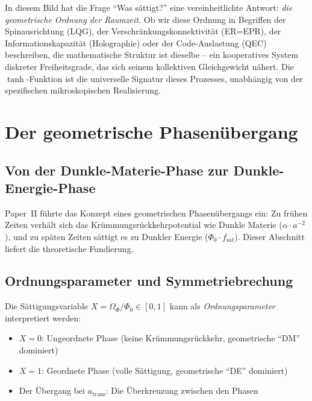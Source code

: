 \documentclass[11pt,a4paper]{article}
\begin{document}
In diesem Bild hat die Frage "`Was s\"attigt?"' eine vereinheitlichte Antwort: \textit{die geometrische Ordnung der Raumzeit.} Ob wir diese Ordnung in Begriffen der Spinausrichtung (LQG), der Verschr\"ankungskonnektivit\"at (ER=EPR), der Informationskapazit\"at (Holographie) oder der Code-Auslastung (QEC) beschreiben, die mathematische Struktur ist dieselbe -- ein kooperatives System diskreter Freiheitsgrade, das sich seinem kollektiven Gleichgewicht n\"ahert. Die $\tanh$-Funktion ist die universelle Signatur dieses Prozesses, unabh\"angig von der spezifischen mikroskopischen Realisierung.


\section{Der geometrische Phasen\"ubergang}
\label{sec:phase_transition}

\subsection{Von der Dunkle-Materie-Phase zur Dunkle-Energie-Phase}

Paper~II \cite{Geiger2026b} f\"uhrte das Konzept eines geometrischen Phasen\"ubergangs ein: Zu fr\"uhen Zeiten verh\"alt sich das Kr\"ummungsr\"uckkehrpotential wie Dunkle Materie ($\alpha \cdot a^{-2}$), und zu sp\"aten Zeiten s\"attigt es zu Dunkler Energie ($\Phi_0 \cdot f_{\mathrm{sat}}$). Dieser Abschnitt liefert die theoretische Fundierung.

\subsection{Ordnungsparameter und Symmetriebrechung}

Die S\"attigungsvariable $X = \Omega_\Phi / \Phi_0 \in [0, 1]$ kann als \textit{Ordnungsparameter} interpretiert werden:
\begin{itemize}
\item $X = 0$: Ungeordnete Phase (keine Kr\"ummungsr\"uckkehr, geometrische "`DM"' dominiert)
\item $X = 1$: Geordnete Phase (volle S\"attigung, geometrische "`DE"' dominiert)
\item Der \"Ubergang bei $a_{\mathrm{trans}}$: Die \"Uberkreuzung zwischen den Phasen
\end{itemize}
\end{document}
